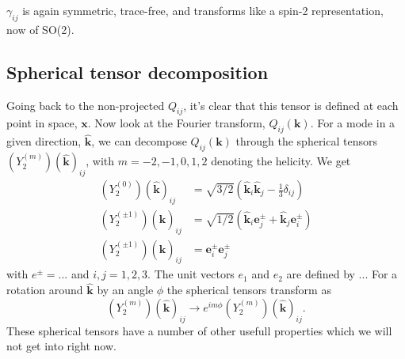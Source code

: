 \documentclass[11pt]{article}
\begin{document}
$\gamma_{ij}$ is again symmetric, trace-free, and transforms like a spin-2 representation, now of SO(2).

\subsection{Spherical tensor decomposition}
Going back to the non-projected $Q_{ij}$, it's clear that this tensor is defined at each point in space, $\mathbf x$. Now look at the Fourier transform, $Q_{ij}(\mathbf k)$. For a mode in a given direction, $\hat{\mathbf k}$, we can decompose $Q_{ij}(\mathbf k)$ through the spherical tensors $(Y_2^{(m)})(\hat{\mathbf k})_{ij}$, with $m=-2, -1, 0, 1, 2$ denoting the helicity. %
We get
\begin{align}
    (Y_2^{(0)})(\hat{\mathbf k})_{ij} &= \sqrt{3/2}(\hat{\mathbf k}_i\hat{\mathbf k}_j - \frac{1}{3}\delta_{ij})\\
    (Y_2^{(\pm 1)})(\hat{\mathbf k})_{ij} &= \sqrt{1/2}(\hat{\mathbf k}_i\mathbf e_j^\pm + \hat{\mathbf k}_j\mathbf e_i^\pm)\\
    (Y_2^{(\pm 1)})(\hat{\mathbf k})_{ij} &= \mathbf e_i^\pm \mathbf e_j^\pm
\end{align}
with $e^{\pm}=...$%
and $i,j=1,2,3$. The unit vectors $e_1$ and $e_2$ are defined by $...$ %
For a rotation around $\hat{\mathbf k}$ by an angle $\phi$ the spherical tensors transform as
$$
(Y_2^{(m)})(\hat{\mathbf k})_{ij} \rightarrow e^{im\phi}(Y_2^{(m)})(\hat{\mathbf k})_{ij}.
$$
These spherical tensors have a number of other usefull properties which we will not get into right now. 
\end{document}

